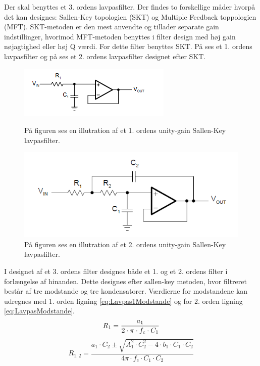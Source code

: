 Der skal benyttes et 3. ordens lavpasfilter. Der findes to forskellige måder hvorpå det kan designes: Sallen-Key topologien (SKT) og Multiple Feedback toppologien (MFT). SKT-metoden er den mest anvendte og tillader separate gain indstillinger, hvorimod MFT-metoden benyttes i filter design med høj gain nøjagtighed eller høj Q værdi. For dette filter benyttes SKT. På  ses et 1. ordens lavpasfilter og på  ses et 2. ordens lavpasfilter designet efter SKT. \cite{Carter2013}
	
\begin{figure}[H]
	\centering
	\begin{minipage}[b]{0.45\textwidth}
		\includegraphics[width=\textwidth]{figures/cProblemloesning/Lavpasfilter1_teoretisk.PNG}
		\caption{På figuren ses en illutration af et 1. ordens unity-gain Sallen-Key lavpasfilter.}
		\label{fig:SallenKey1}
	\end{minipage}
	\hfill
	\begin{minipage}[b]{0.45\textwidth}
		\includegraphics[width=\textwidth]{figures/cProblemloesning/Sallenlavpas.PNG}
		\caption{På figuren ses en illutration af et 2. ordens unity-gain Sallen-Key lavpasfilter.}
		\label{fig:SallenKey2}
	\end{minipage}
\end{figure}

I designet af et 3. ordens filter designes både et 1. og et 2. ordens filter i forlængelse af hinanden. Dette designes efter sallen-key metoden, hvor filtreret består af tre modstande og tre kondensatorer. Værdierne for modstandene kan udregnes med 1. orden ligning \ref{eq:Lavpas1Modstande} og for 2. orden ligning \ref{eq:LavpasModstande}. 
\begin{equation} \label{eq:Lavpas1Modstande}
R_{1} = \frac{a_1}{2 \cdot \pi \cdot f_c \cdot C_1} \\
\end{equation}
\begin{equation}
 \label{eq:LavpasModstande}
R_{1,2} = \frac{a_1 \cdot C_2 \pm \sqrt{A_1^2 \cdot C_2^2 - 4 \cdot b_1 \cdot C_1 \cdot C_2}}{4 \pi \cdot f_c \cdot C_1 \cdot C_2}
\end{equation}

